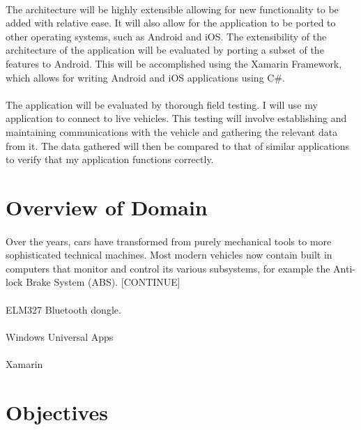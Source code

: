 \documentclass[12pt]{report}
\begin{document}
			\paragraph{}
			{
			The architecture will be highly extensible allowing for new functionality to be added with relative ease. It will also allow for the application to be ported to other operating systems, such as Android and iOS. The extensibility of the architecture of the application will be evaluated by porting a subset of the features to Android. This will be accomplished using the Xamarin Framework, which allows for writing Android and iOS applications using C{\#}.
			}
			\paragraph{}
			{
			The application will be evaluated by thorough field testing. I will use my application to connect to live vehicles. This testing will involve establishing and maintaining communications with the vehicle and gathering the relevant data from it. The data gathered will then be compared to that of similar applications to verify that my application functions correctly.
			}
		\section{Overview of Domain}
			\paragraph{}{
			Over the years, cars have transformed from purely mechanical tools to more sophisticated technical machines. Most modern vehicles now contain built in computers that monitor and control its various subsystems, for example the Anti-lock Brake System (ABS). [CONTINUE]
			 
			}
			\paragraph{}{
			ELM327 Bluetooth dongle.
			}
			\paragraph{}{
			Windows Universal Apps
			}
			\paragraph{}{
			Xamarin
			}
			
		\section{Objectives}
\end{document}
